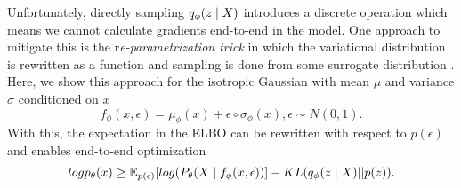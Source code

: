 Unfortunately, directly sampling $q_{\phi}(z \; | \;{X})$ introduces a discrete operation which means we cannot calculate gradients end-to-end in the model. One approach to mitigate this is the r\textit{e-parametrization trick} in which the variational distribution  is rewritten as a function and sampling is done from some surrogate  distribution \cite{kingma2014autoencodingVB,rezende2014stochasticBackprop} . Here, we show this approach for the isotropic Gaussian with mean $\mu$ and variance $\sigma$ conditioned on $x$
\begin{equation}
f_{\phi}(x, \epsilon) = \mu_{\phi}(x) + \epsilon \circ \sigma_{\phi}(x), \epsilon \sim N(0, 1).
\end{equation}
With this, the expectation in the \ac{ELBO} can be rewritten with respect to $p(\epsilon)$ and enables end-to-end optimization 
\begin{equation}
log p_{\theta}(x) \geq \operatorname{\mathbb{E}}_{p(\epsilon) } [ log(P_{\theta}(X \; | \;{f_{\phi}(x, \epsilon)}) ]  - KL(q_{\phi}(z \; | \;{X}) || p(z)).
\end{equation}








